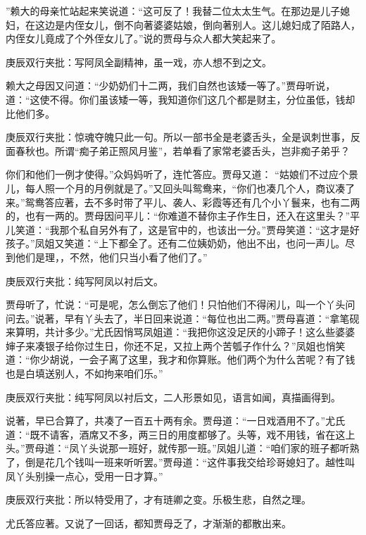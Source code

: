 \begin{parag}
”赖大的母亲忙站起来笑说道：“这可反了！我替二位太太生气。在那边是儿子媳妇，在这边是内侄女儿，倒不向著婆婆姑娘，倒向著别人。这儿媳妇成了陌路人，内侄女儿竟成了个外侄女儿了。”说的贾母与众人都大笑起来了。\begin{note}庚辰双行夹批：写阿凤全副精神，虽一戏，亦人想不到之文。\end{note}赖大之母因又问道：“少奶奶们十二两，我们自然也该矮一等了。”贾母听说，道：“这使不得。你们虽该矮一等，我知道你们这几个都是财主，分位虽低，钱却比他们多。\begin{note}庚辰双行夹批：惊魂夺魄只此一句。所以一部书全是老婆舌头，全是讽刺世事，反面春秋也。所谓“痴子弟正照风月鉴”，若单看了家常老婆舌头，岂非痴子弟乎？\end{note}你们和他们一例才使得。”众妈妈听了，连忙答应。贾母又道： “姑娘们不过应个景儿，每人照一个月的月例就是了。”又回头叫鸳鸯来，“你们也凑几个人，商议凑了来。”鸳鸯答应著，去不多时带了平儿、袭人、彩霞等还有几个小丫鬟来，也有二两的，也有一两的。贾母因问平儿：“你难道不替你主子作生日，还入在这里头？”平儿笑道：“我那个私自另外有了，这是官中的，也该出一分。”贾母笑道：“这才是好孩子。”凤姐又笑道：“上下都全了。还有二位姨奶奶，他出不出，也问一声儿。尽到他们是理，，不然，他们只当小看了他们了。”\begin{note}庚辰双行夹批：纯写阿凤以衬后文。\end{note}贾母听了，忙说：“可是呢，怎么倒忘了他们！只怕他们不得闲儿，叫一个丫头问问去。”说著，早有丫头去了，半日回来说道：“每位也出二两。”贾母喜道：“拿笔砚来算明，共计多少。”尤氏因悄骂凤姐道：“我把你这没足厌的小蹄子！这么些婆婆婶子来凑银子给你过生日，你还不足，又拉上两个苦瓠子作什么？”凤姐也悄笑道：“你少胡说，一会子离了这里，我才和你算账。他们两个为什么苦呢？有了钱也是白填送别人，不如拘来咱们乐。”\begin{note}庚辰双行夹批：纯写阿凤以衬后文，二人形景如见，语言如闻，真描画得到。\end{note}
\end{parag}


\begin{parag}


    说著，早已合算了，共凑了一百五十两有余。贾母道：“一日戏酒用不了。”尤氏道：“既不请客，酒席又不多，两三日的用度都够了。头等，戏不用钱，省在这上头。”贾母道：“凤丫头说那一班好，就传那一班。”凤姐儿道：“咱们家的班子都听熟了，倒是花几个钱叫一班来听听罢。”贾母道：“这件事我交给珍哥媳妇了。越性叫凤丫头别操一点心，受用一日才算。”\begin{note}庚辰双行夹批：所以特受用了，才有琏卿之变。乐极生悲，自然之理。\end{note}尤氏答应著。又说了一回话，都知贾母乏了，才渐渐的都散出来。
\end{parag}


